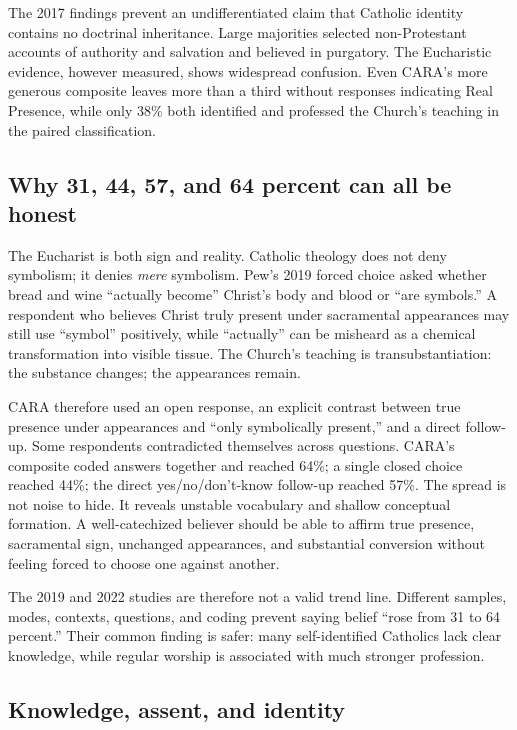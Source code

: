 The 2017 findings prevent an undifferentiated claim that Catholic identity contains no doctrinal inheritance. Large majorities selected non-Protestant accounts of authority and salvation and believed in purgatory. The Eucharistic evidence, however measured, shows widespread confusion. Even CARA's more generous composite leaves more than a third without responses indicating Real Presence, while only 38\% both identified and professed the Church's teaching in the paired classification.

\subsection{Why 31, 44, 57, and 64 percent can all be honest}

The Eucharist is both sign and reality. Catholic theology does not deny symbolism; it denies \emph{mere} symbolism. Pew's 2019 forced choice asked whether bread and wine “actually become” Christ's body and blood or “are symbols.” A respondent who believes Christ truly present under sacramental appearances may still use “symbol” positively, while “actually” can be misheard as a chemical transformation into visible tissue. The Church's teaching is transubstantiation: the substance changes; the appearances remain.

CARA therefore used an open response, an explicit contrast between true presence under appearances and “only symbolically present,” and a direct follow-up. Some respondents contradicted themselves across questions. CARA's composite coded answers together and reached 64\%; a single closed choice reached 44\%; the direct yes/no/don't-know follow-up reached 57\%. The spread is not noise to hide. It reveals unstable vocabulary and shallow conceptual formation. A well-catechized believer should be able to affirm true presence, sacramental sign, unchanged appearances, and substantial conversion without feeling forced to choose one against another.

The 2019 and 2022 studies are therefore not a valid trend line. Different samples, modes, contexts, questions, and coding prevent saying belief “rose from 31 to 64 percent.” Their common finding is safer: many self-identified Catholics lack clear knowledge, while regular worship is associated with much stronger profession.

\subsection{Knowledge, assent, and identity}

